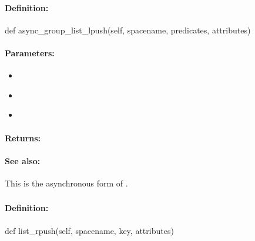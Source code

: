 \paragraph{Definition:}
\begin{pythoncode}
def async_group_list_lpush(self, spacename, predicates, attributes)
\end{pythoncode}

\paragraph{Parameters:}
\begin{itemize}[noitemsep]
\item {}\\

\item {}\\

\item {}\\

\end{itemize}

\paragraph{Returns:}


\paragraph{See also:}  This is the asynchronous form of .

\pagebreak
\subsubsection{}
\label{api:python:list_rpush}


\paragraph{Definition:}
\begin{pythoncode}
def list_rpush(self, spacename, key, attributes)
\end{pythoncode}

